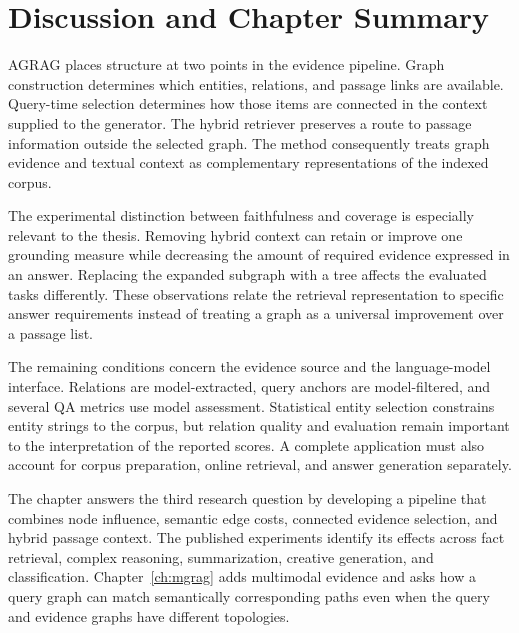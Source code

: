 \section{Discussion and Chapter Summary}
\label{sec:agrag:discussion}
AGRAG places structure at two points in the evidence pipeline. Graph construction determines which entities, relations, and passage links are available. Query-time selection determines how those items are connected in the context supplied to the generator. The hybrid retriever preserves a route to passage information outside the selected graph. The method consequently treats graph evidence and textual context as complementary representations of the indexed corpus.

The experimental distinction between faithfulness and coverage is especially relevant to the thesis. Removing hybrid context can retain or improve one grounding measure while decreasing the amount of required evidence expressed in an answer. Replacing the expanded subgraph with a tree affects the evaluated tasks differently. These observations relate the retrieval representation to specific answer requirements instead of treating a graph as a universal improvement over a passage list.

The remaining conditions concern the evidence source and the language-model interface. Relations are model-extracted, query anchors are model-filtered, and several QA metrics use model assessment. Statistical entity selection constrains entity strings to the corpus, but relation quality and evaluation remain important to the interpretation of the reported scores. A complete application must also account for corpus preparation, online retrieval, and answer generation separately.

The chapter answers the third research question by developing a pipeline that combines node influence, semantic edge costs, connected evidence selection, and hybrid passage context. The published experiments identify its effects across fact retrieval, complex reasoning, summarization, creative generation, and classification. Chapter~\ref{ch:mgrag} adds multimodal evidence and asks how a query graph can match semantically corresponding paths even when the query and evidence graphs have different topologies.
